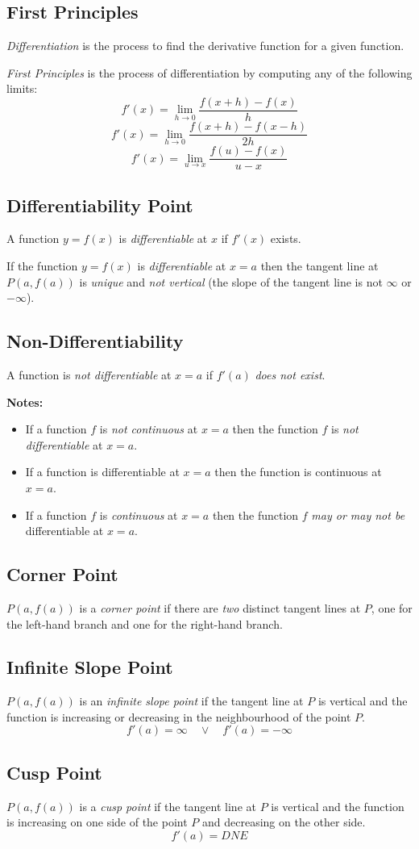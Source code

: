 \subsection{First Principles}
	\emph{Differentiation} is the process to find the derivative function for a given function.

	\emph{First Principles} is the process of differentiation by computing any of the following limits:
	\[f'(x) = \lim_{h \to 0} \frac{f(x+h) - f(x)}{h}\]
	\[f'(x) = \lim_{h \to 0} \frac{f(x+h) - f(x-h)}{2h}\]
	\[f'(x) = \lim_{u \to x} \frac{f(u) - f(x)}{u-x}\]
\subsection{Differentiability Point}
	A function $y=f(x)$ is \emph{differentiable} at $x$ if $f'(x)$ exists.

	If the function $y=f(x)$ is \emph{differentiable} at $x=a$ then the tangent line at $P(a,f(a))$ is \emph{unique} and \emph{not vertical} (the slope of the tangent line is not $\infty$ or $-\infty$).
\subsection{Non-Differentiability}
	A function is \emph{not differentiable} at $x=a$ if $f'(a)$ \emph{does not exist}.

	\textbf{Notes:}
	\begin{itemize}
		\item If a function $f$ is \emph{not continuous} at $x=a$ then the function $f$ is \emph{not differentiable} at $x=a$.
		\item If a function is differentiable at $x=a$ then the function is continuous at $x=a$.
		\item If a function $f$ is \emph{continuous} at $x=a$ then the function $f$ \emph{may or may not be} differentiable at $x=a$.
	\end{itemize}
\subsection{Corner Point}
	$P(a,f(a))$ is a \emph{corner point} if there are \emph{two} distinct tangent lines at $P$, one for the left-hand branch and one for the right-hand branch.
\subsection{Infinite Slope Point}
	$P(a,f(a))$ is an \emph{infinite slope point} if the tangent line at $P$ is vertical and the function is increasing or decreasing in the neighbourhood of the point $P$.
	\[f'(a) = \infty \quad \lor \quad f'(a) = -\infty\]
\subsection{Cusp Point}
	$P(a,f(a))$ is a \emph{cusp point} if the tangent line at $P$ is vertical and the function is increasing on one side of the point $P$ and decreasing on the other side.
	\[f'(a) = DNE\]
